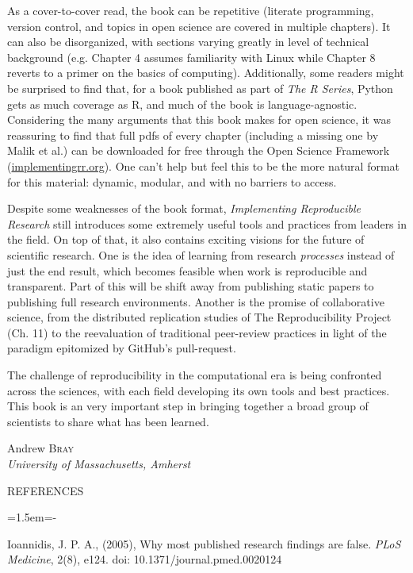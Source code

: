 \documentclass[12pt]{article}
\newenvironment{references}{
  \begin{center} \textsf{REFERENCES} \end{center}
  \begin{list}{}{\topsep=0pt\parsep=0pt\baselineskip=20pt
   \leftmargin=1.5em\itemindent=-\leftmargin}}
  {\end{list}}
\begin{document}
As a cover-to-cover read, the book can be repetitive (literate programming, version
control, and topics in open science are covered in multiple chapters).  It can also be
disorganized, with sections varying greatly in level of technical background
(e.g. Chapter 4 assumes familiarity with Linux while Chapter 8 reverts to a primer on
the basics of computing). Additionally, some readers might be 
surprised to find that, for a book published as part of \emph{The R Series}, 
Python gets as much coverage as R, and much of the book is language-agnostic.
Considering the many arguments that this book makes for open science, it was
reassuring to find that full pdfs of every chapter (including a missing one by 
Malik et al.) can be downloaded for free through the Open Science Framework 
(\url{implementingrr.org}). One can't help but feel this to be the more natural format
 for this material: dynamic, modular, and with no barriers to access.

Despite some weaknesses of the book format, \emph{Implementing Reproducible
Research} still introduces some extremely useful tools and practices from leaders in 
the field.  On top of that, it also contains exciting visions for the future of scientific research.
One is the idea of learning from research \emph{processes} instead of just the 
end result, which becomes feasible when work is reproducible and transparent.
Part of this will be shift away from publishing static papers to publishing full research
environments.  Another is the promise of collaborative science, from the distributed
replication studies of The Reproducibility Project (Ch. 11) to the reevaluation of traditional 
peer-review practices in light of the paradigm epitomized by GitHub's pull-request.

The challenge of reproducibility in the computational era is being confronted 
across the sciences, with each field developing its own tools and best practices.
This book is an very important step in bringing together a broad group of scientists
to share what has been learned.



\begin{flushright}\def\baselinestretch{1}
Andrew \textsc{Bray}\\
\emph{University of Massachusetts, Amherst}

\end{flushright}


\begin{references}

\item Ioannidis, J. P. A., (2005), Why most published research findings are false.
	\emph{PLoS Medicine}, 2(8), e124. doi: 10.1371/journal.pmed.0020124

\end{references}
\end{document}
